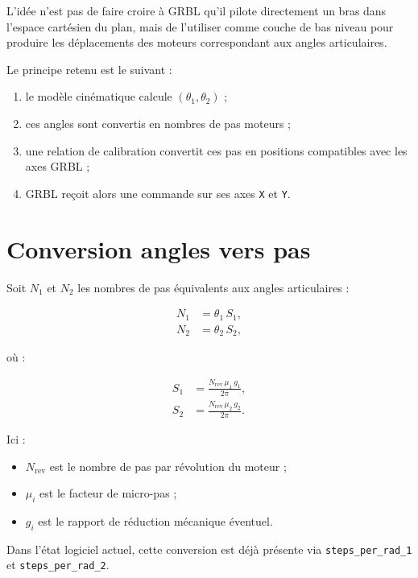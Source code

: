 \documentclass[12pt,a4paper]{report}
\newcommand{\thone}{\theta_1}
\newcommand{\thtwo}{\theta_2}
\begin{document}
L'idée n'est pas de faire croire à GRBL qu'il pilote directement un bras dans l'espace
cartésien du plan, mais de l'utiliser comme couche de bas niveau pour produire les
déplacements des moteurs correspondant aux angles articulaires.

Le principe retenu est le suivant :

\begin{enumerate}[label=\arabic*.]
    \item le modèle cinématique calcule $(\thone,\thtwo)$ ;
    \item ces angles sont convertis en nombres de pas moteurs ;
    \item une relation de calibration convertit ces pas en positions compatibles avec les axes GRBL ;
    \item GRBL reçoit alors une commande sur ses axes \texttt{X} et \texttt{Y}.
\end{enumerate}

\section{Conversion angles vers pas}

Soit $N_1$ et $N_2$ les nombres de pas équivalents aux angles articulaires :

\begin{align}
    N_1 &= \thone \, S_1, \\
    N_2 &= \thtwo \, S_2,
\end{align}

où :

\begin{align}
    S_1 &= \frac{N_{\text{rev}} \, \mu_1 \, g_1}{2\pi}, \\
    S_2 &= \frac{N_{\text{rev}} \, \mu_2 \, g_2}{2\pi}.
\end{align}

Ici :

\begin{itemize}
    \item $N_{\text{rev}}$ est le nombre de pas par révolution du moteur ;
    \item $\mu_i$ est le facteur de micro-pas ;
    \item $g_i$ est le rapport de réduction mécanique éventuel.
\end{itemize}

Dans l'état logiciel actuel, cette conversion est déjà présente via
\texttt{steps\_per\_rad\_1} et \texttt{steps\_per\_rad\_2}.
\end{document}
